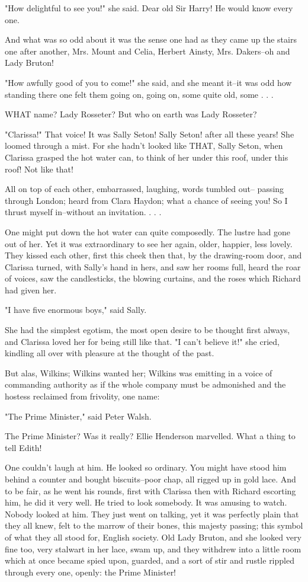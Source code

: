 \documentclass[lang=cn,10pt]{elegantbook}
\begin{document}
"How delightful to see you!" she said.  Dear old Sir Harry!  He
would know every one.

And what was so odd about it was the sense one had as they came up
the stairs one after another, Mrs. Mount and Celia, Herbert Ainsty,
Mrs. Dakers--oh and Lady Bruton!

"How awfully good of you to come!" she said, and she meant it--it
was odd how standing there one felt them going on, going on, some
quite old, some . . .

WHAT name?  Lady Rosseter?  But who on earth was Lady Rosseter?

"Clarissa!"  That voice!  It was Sally Seton!  Sally Seton! after
all these years!  She loomed through a mist.  For she hadn't looked
like THAT, Sally Seton, when Clarissa grasped the hot water can, to
think of her under this roof, under this roof!  Not like that!

All on top of each other, embarrassed, laughing, words tumbled out--
passing through London; heard from Clara Haydon; what a chance of
seeing you!  So I thrust myself in--without an invitation. . . .

One might put down the hot water can quite composedly.  The lustre
had gone out of her.  Yet it was extraordinary to see her again,
older, happier, less lovely.  They kissed each other, first this
cheek then that, by the drawing-room door, and Clarissa turned,
with Sally's hand in hers, and saw her rooms full, heard the roar
of voices, saw the candlesticks, the blowing curtains, and the
roses which Richard had given her.

"I have five enormous boys," said Sally.

She had the simplest egotism, the most open desire to be thought
first always, and Clarissa loved her for being still like that.  "I
can't believe it!" she cried, kindling all over with pleasure at
the thought of the past.

But alas, Wilkins; Wilkins wanted her; Wilkins was emitting in a
voice of commanding authority as if the whole company must be
admonished and the hostess reclaimed from frivolity, one name:

"The Prime Minister," said Peter Walsh.

The Prime Minister?  Was it really?  Ellie Henderson marvelled.
What a thing to tell Edith!

One couldn't laugh at him.  He looked so ordinary.  You might have
stood him behind a counter and bought biscuits--poor chap, all
rigged up in gold lace.  And to be fair, as he went his rounds,
first with Clarissa then with Richard escorting him, he did it very
well.  He tried to look somebody.  It was amusing to watch.  Nobody
looked at him.  They just went on talking, yet it was perfectly
plain that they all knew, felt to the marrow of their bones, this
majesty passing; this symbol of what they all stood for, English
society.  Old Lady Bruton, and she looked very fine too, very
stalwart in her lace, swam up, and they withdrew into a little room
which at once became spied upon, guarded, and a sort of stir and
rustle rippled through every one, openly: the Prime Minister!
\end{document}
